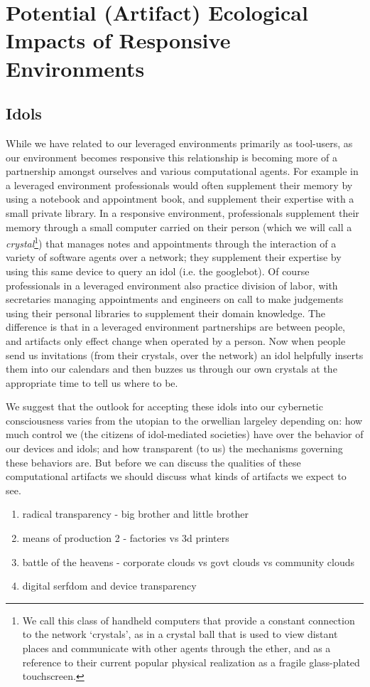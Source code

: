 \section{Potential (Artifact) Ecological Impacts of Responsive Environments}
\label{sec:ecological_impacts}
%
\subsection{Idols}
%
While we have related to our leveraged environments primarily as tool-users, as our environment becomes responsive this relationship is becoming more of a partnership amongst ourselves and various computational agents. 
For example in a leveraged environment professionals would often supplement their memory by using a notebook and appointment book, and supplement their expertise with a small private library. 
In a responsive environment, professionals supplement their memory through a small computer carried on their person (which we will call a \emph{crystal}\footnote{We call this class of handheld computers that provide a constant connection to the network `crystals', as in a crystal ball that is used to view distant places and communicate with other agents through the ether, and as a reference to their current popular physical realization as a fragile glass-plated touchscreen.}) that manages notes and appointments through the interaction of a variety of software agents over a network; they supplement their expertise by using this same device to query an idol (i.e. the googlebot).
Of course professionals in a leveraged environment also practice division of labor, with secretaries managing appointments and engineers on call to make judgements using their personal libraries to supplement their domain knowledge.
The difference is that in a leveraged environment partnerships are between people, and artifacts only effect change when operated by a person.
Now when people send us invitations (from their crystals, over the network) an idol helpfully inserts them into our calendars and then buzzes us through our own crystals at the appropriate time to tell us where to be.

We suggest that the outlook for accepting these idols into our cybernetic consciousness varies from the utopian to the orwellian largeley depending on: how much control we (the citizens of idol-mediated societies) have over the behavior of our devices and idols; and how transparent (to us) the mechanisms governing these behaviors are. But before we can discuss the qualities of these computational artifacts we should discuss what kinds of artifacts we expect to see.

    \begin{enumerate}
        \item radical transparency - big brother and little brother
        \item means of production 2 - factories vs 3d printers
        \item battle of the heavens - corporate clouds vs govt clouds vs community clouds
        \item digital serfdom and device transparency
    \end{enumerate}



